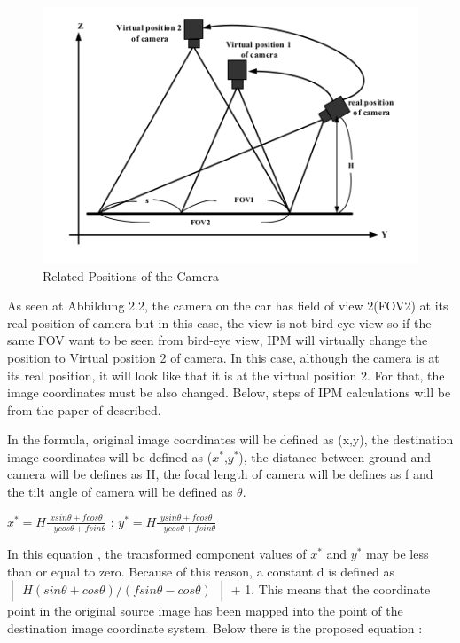  \begin{figure}[H]
	\centering
	\hspace*{0cm}   
	\includegraphics[width=150mm,scale=1]{./Bilder/Related_positions_of_the_camera.png}
	\caption{Related Positions of the Camera \cite{IPM}}
\end{figure}
 
 As seen at Abbildung 2.2, the camera on the car has field of view 2(FOV2) at its real position of camera but in this 
 case, the view is not bird-eye view so if the same FOV want to be seen from bird-eye view, IPM will virtually change
 the position to Virtual position 2 of camera. In this case, although the camera is at its real position, it will look
 like that it is at the virtual position 2. For that, the image coordinates must be also changed. Below, steps of IPM 
 calculations will be from the paper of \cite{IPM} described.
 
 In the formula, original image coordinates will be defined as (x,y), the destination image coordinates will be 
 defined as ($x^*$,$y^*$), the distance between ground and camera will be defines as H, the focal length of camera 
 will be defines as f and the tilt angle of camera will be defined as $\theta$.
 
\begin{center}
 $x^* = H \frac{x sin \theta + f cos \theta}{-y cos \theta + f sin \theta}$ ;
 $y^* = H \frac{y sin \theta + f cos \theta}{-y cos \theta + f sin \theta}$ 
\end{center}

In this equation , the transformed component values of $x^*$ and $y^*$ may be less than or equal to zero. Because of 
this reason, a constant d is defined as $
\begin{vmatrix}
H(sin \theta + cos \theta)/(f sin \theta - cos \theta) 
\end{vmatrix}
$  + 1. This means that the coordinate point in the original source image has been mapped into the point of  the 
destination image coordinate system. Below there is the proposed equation :
 
